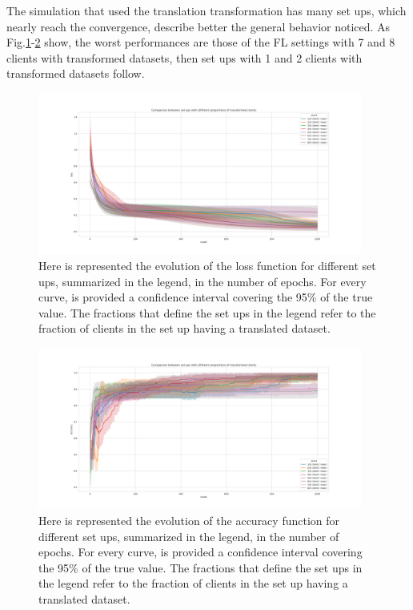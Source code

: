 \documentclass{article} %
\newcounter{late}
\begin{document}
\newpage
The simulation that used the translation transformation has many set ups, which nearly reach 
the convergence, describe better the general behavior noticed.
As Fig.\ref{fig10}-\ref{fig11} show, the worst performances are those of the FL settings with 
7 and 8 clients with transformed datasets, then set ups with 1 and 2 clients with transformed 
datasets follow.
\begin{figure}[!h]
    \centering
        \includegraphics[width=0.95\textwidth, keepaspectratio]{images/loss_red_TL1.png}    
    \caption{Here is represented the evolution of the loss function for different set ups, 
    summarized in the legend, in the number of epochs. For every curve, is provided a confidence 
    interval covering the 95\% of the true value. The fractions that define the set ups in the 
    legend refer to the fraction of clients in the set up having a translated dataset.}
    \label{fig10}
\end{figure}
\begin{figure}[!h]
    \centering
        \includegraphics[width=0.95\textwidth, keepaspectratio]{images/accuracy_red_TL1.png}
    \caption{Here is represented the evolution of the accuracy function for different set ups, 
    summarized in the legend, in the number of epochs. For every curve, is provided a confidence 
    interval covering the 95\% of the true value. The fractions that define the set ups in the 
    legend refer to the fraction of clients in the set up having a translated dataset.}
    \label{fig11}
\end{figure}



\newpage



\renewcommand\thefigure{\thesection.\arabic{figure}}
\end{document}
